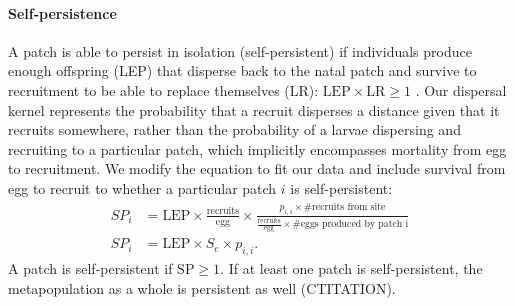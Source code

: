\documentclass[12pt, oneside]{article}   	%
\begin{document}
\paragraph*{Self-persistence}

A patch is able to persist in isolation (self-persistent) if individuals produce enough offspring (LEP) that disperse back to the natal patch and survive to recruitment to be able to replace themselves (LR): $\text{LEP} \times \text{LR} \geq 1$ \citep{burgess2014beyond}. Our dispersal kernel represents the probability that a recruit disperses a distance given that it recruits somewhere, rather than the probability of a larvae dispersing and recruiting to a particular patch, which implicitly encompasses mortality from egg to recruitment. We modify the equation to fit our data and include survival from egg to recruit to whether a particular patch $i$ is self-persistent: 
\begin{equation}
\begin{split}
SP_i &= \text{LEP} \times \frac{\text{recruits}}{\text{egg}} \times \frac{p_{i,i} \times \text{\# recruits from site}}{\frac{\text{recruits}}{\text{egg}} \times \text{\# eggs produced by patch i}} \\ 
SP_i &= \text{LEP} \times S_e \times p_{i,i}. \label{EQN_SP}
\end{split}
\end{equation}
A patch is self-persistent if $\text{SP} \geq 1$. If at least one patch is self-persistent, the metapopulation as a whole is persistent as well (CTITATION).




\end{document}
